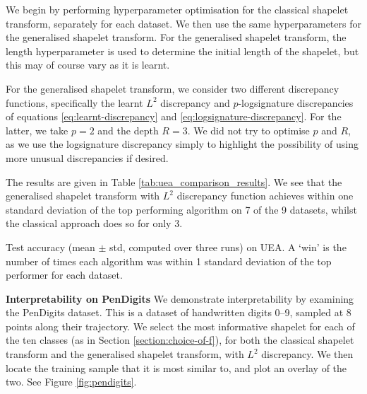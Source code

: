\documentclass{article}
\theoremstyle{plain}
\theoremstyle{definition}
\newcommand{\boldheading}[1]{

\textbf{#1}\quad}
\begin{document}
We begin by performing hyperparameter optimisation %
for the classical shapelet transform, separately for each dataset. We then use the same hyperparameters for the generalised shapelet transform. For the generalised shapelet transform, the length hyperparameter is used to determine the initial length of the shapelet, but this may of course vary as it is learnt.

For the generalised shapelet transform, we consider two different discrepancy functions, specifically the learnt $L^2$ discrepancy and $p$-logsignature discrepancies of equations \eqref{eq:learnt-discrepancy} and \eqref{eq:logsignature-discrepancy}. For the latter, we take $p=2$ and the depth $R=3$. We did not try to optimise $p$ and $R$, as we use the logsignature discrepancy simply to highlight the possibility of using more unusual discrepancies if desired.

The results are given in Table \ref{tab:uea_comparison_results}. We see that the generalised shapelet transform with $L^2$ discrepancy function achieves within one standard deviation of the top performing algorithm on 7 of the 9 datasets, whilst the classical approach does so for only 3.%
\begin{table}[t]
    \centering
    \caption{Test accuracy (mean $\pm$ std, computed over three runs) on UEA. A `win' is the number of times each algorithm was within 1 standard deviation of the top performer for each dataset.}
    \label{tab:uea_comparison_results}
    
\end{table}

\boldheading{Interpretability on PenDigits}
We demonstrate interpretability by examining the PenDigits dataset. This is a dataset of handwritten digits 0--9, sampled at 8 points along their trajectory. We select the most informative shapelet for each of the ten classes (as in Section \ref{section:choice-of-f}), for both the classical shapelet transform and the generalised shapelet transform, with $L^2$ discrepancy. We then locate the training sample that it is most similar to, and plot an overlay of the two. See Figure \ref{fig:pendigits}.
\end{document}

